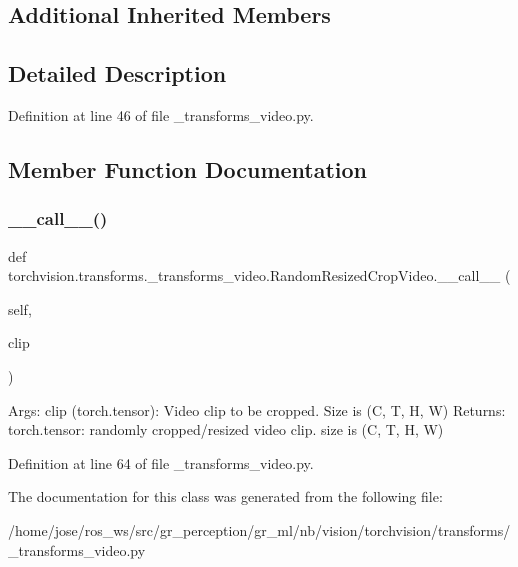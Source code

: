 \subsection*{Additional Inherited Members}


\subsection{Detailed Description}


Definition at line 46 of file \+\_\+transforms\+\_\+video.\+py.



\subsection{Member Function Documentation}
\mbox{\label{classtorchvision_1_1transforms_1_1__transforms__video_1_1RandomResizedCropVideo_a63213aaed04b2f7cc4f4a10f1132f0a3}} 
\subsubsection{\texorpdfstring{\+\_\+\+\_\+call\+\_\+\+\_\+()}{\_\_call\_\_()}}
{\footnotesize\ttfamily def torchvision.\+transforms.\+\_\+transforms\+\_\+video.\+Random\+Resized\+Crop\+Video.\+\_\+\+\_\+call\+\_\+\+\_\+ (\begin{DoxyParamCaption}\item[{}]{self,  }\item[{}]{clip }\end{DoxyParamCaption})}

\begin{DoxyVerb}Args:
    clip (torch.tensor): Video clip to be cropped. Size is (C, T, H, W)
Returns:
    torch.tensor: randomly cropped/resized video clip.
size is (C, T, H, W)
\end{DoxyVerb}
 

Definition at line 64 of file \+\_\+transforms\+\_\+video.\+py.



The documentation for this class was generated from the following file\+:\begin{DoxyCompactItemize}
\item 
/home/jose/ros\+\_\+ws/src/gr\+\_\+perception/gr\+\_\+ml/nb/vision/torchvision/transforms/\+\_\+transforms\+\_\+video.\+py\end{DoxyCompactItemize}

